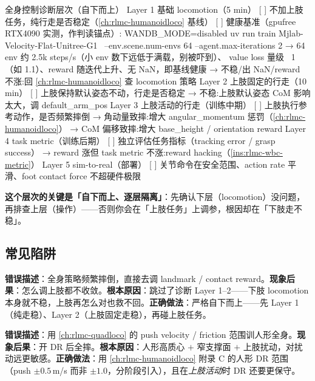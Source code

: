 \begin{codebox}[text]{全身控制诊断层次（自下而上）}
Layer 1 基础 locomotion（5 min）
  [ ] 不加上肢任务，纯行走是否稳定（\cref{ch:rlmc-humanoidloco} 基线）
  [ ] 健康基准（gpufree RTX4090 实测，作判读锚点）:
      WANDB_MODE=disabled uv run train Mjlab-Velocity-Flat-Unitree-G1 \
        --env.scene.num-envs 64 --agent.max-iterations 2
      → 64 env 约 2.5k steps/s（小 env 数下远低于满载，别被吓到）、
        value loss 量级 ~1（如 1.1）、reward 随迭代上升、无 NaN，即基线健康
  → 不稳/出 NaN/reward 不涨:回 \cref{ch:rlmc-humanoidloco} 查 locomotion 策略
Layer 2 上肢固定的行走（10 min）
  [ ] 上肢保持默认姿态不动，行走是否稳定
  → 不稳:上肢默认姿态 CoM 影响太大，调 default_arm_pos
Layer 3 上肢活动的行走（训练中期）
  [ ] 上肢执行参考动作，是否频繁摔倒
  → 角动量致摔:增大 angular_momentum 惩罚（\cref{ch:rlmc-humanoidloco}）
  → CoM 偏移致摔:增大 base_height / orientation reward
Layer 4 task metric（训练后期）
  [ ] 独立评估任务指标（tracking error / grasp success）
  → reward 涨但 task metric 不涨:reward hacking（\cref{ins:rlmc-wbc-metric}）
Layer 5 sim-to-real（部署）
  [ ] 关节命令在安全范围、action rate 平滑、foot contact force 不超硬件极限
\end{codebox}

\textbf{这个层次的关键是「自下而上、逐层隔离」}：先确认下层（locomotion）没问题，再排查上层（操作）——否则你会在「上肢任务」上调参，根因却在「下肢走不稳」。

\subsection{常见陷阱}
\begin{pitfall}
\textbf{错误描述}：全身策略频繁摔倒，直接去调 landmark / contact reward。\textbf{现象后果}：怎么调上肢都不收敛。\textbf{根本原因}：跳过了诊断 Layer 1--2——下肢 locomotion 本身就不稳，上肢再怎么对也救不回。\textbf{正确做法}：严格自下而上——先 Layer 1（纯走稳）、Layer 2（上肢固定走稳），再碰上肢任务。
\end{pitfall}
\begin{pitfall}
\textbf{错误描述}：用 \cref{ch:rlmc-quadloco} 的 push velocity / friction 范围训人形全身。\textbf{现象后果}：开 DR 后全摔。\textbf{根本原因}：人形高质心 $+$ 窄支撑面 $+$ 上肢扰动，对扰动远更敏感。\textbf{正确做法}：用 \cref{ch:rlmc-humanoidloco} 附录 C 的人形 DR 范围（push $\pm0.5$\,m/s 而非 $\pm1.0$，分阶段引入），且在\emph{上肢活动}时 DR 还要更保守。
\end{pitfall}


